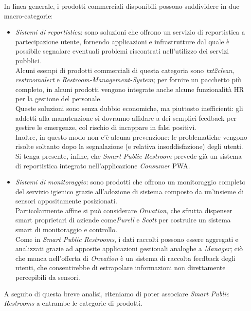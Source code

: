 \documentclass[12pt]{article}
\begin{document}
In linea generale, i prodotti commerciali disponibili possono suddividere in due macro-categorie:
\begin{itemize}
	\item \textit{Sistemi di reportistica}: sono soluzioni che offrono un servizio di reportistica a partecipazione utente, fornendo applicazioni e infrastrutture dal quale è possibile segnalare eventuali problemi riscontrati nell'utilizzo dei servizi pubblici.\\
	Alcuni esempi di prodotti commerciali di questa categoria sono \textit{txt2clean}\cite{txt2clean},\\\textit{restroomalert} \cite{restroomalert} e \textit{Restroom-Management-System}\cite{restroom-management-system}; per fornire un pacchetto più completo, in alcuni prodotti vengono integrate anche alcune funzionalità HR per la gestione del personale.\\
Queste soluzioni sono senza dubbio economiche, ma piuttosto inefficienti: gli addetti alla manutenzione si dovranno affidare a dei semplici feedback per gestire le emergenze, col rischio di incappare in falsi positivi.\\
Inoltre, in questo modo non c'è alcuna prevenzione: le problematiche vengono risolte soltanto dopo la segnalazione (e relativa insoddisfazione) degli utenti.\\
Si tenga presente, infine, che \textit{Smart Public Restroom} prevede già un sistema di reportistica integrato nell'applicazione \textit{Consumer} PWA.
	\item \textit{Sistemi di monitoraggio}: sono prodotti che offrono un monitoraggio completo del servizio igienico grazie all'adozione di sistema composto da un'insieme di sensori appositamente posizionati.\\
	Particolarmente affine si può considerare \textit{Onvation}\cite{onvation}, che sfrutta dispenser smart proprietari di aziende come\textit{Purell} e \textit{Scott} per costruire un sistema smart di monitoraggio e controllo.\\
	Come in \textit{Smart Public Restrooms}, i dati raccolti possono essere aggregati e analizzati grazie ad apposite applicazioni gestionali analoghe a \textit{Manager}; ciò che manca nell'offerta di \textit{Onvation} è un sistema di raccolta feedback degli utenti, che consentirebbe di estrapolare informazioni non direttamente percepibili da sensori.
\end{itemize}
A seguito di questa breve analisi, riteniamo di poter associare \textit{Smart Public Restrooms} a entrambe le categorie di prodotti. 
\end{document}
